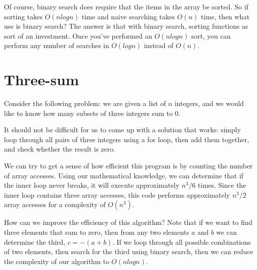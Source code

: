 \documentclass{article}
\begin{document}
Of course, binary search does require that the items in the array be sorted. So if sorting takes $O(n log n)$ time and naive searching takes $O(n)$ time, then what use is binary search? The answer is that with binary search, sorting functions as sort of an investment. Once you've performed an $O(n log n)$ sort, you can perform any number of searches in $O(log n)$ instead of $O(n)$.



\section{Three-sum}

Consider the following problem: we are given a list of $n$ integers, and we would like to know how many subsets of three integers sum to 0.

It should not be difficult for us to come up with a solution that works: simply loop through all pairs of three integers using a for loop, then add them together, and check whether the result is zero.


We can try to get a sense of how efficient this program is by counting the number of array accesses. Using our mathematical knowledge, we can determine that if the inner loop never breaks, it will execute approximately $n^3/6$ times. Since the inner loop contains three array accesses, this code performs approximately $n^3/2$ array accesses for a complexity of $O(n^3)$.

How can we improve the efficiency of this algorithm? Note that if we want to find three elements that sum to zero, then from any two elements $a$ and $b$ we can determine the third, $c = -(a + b)$. If we loop through all possible combinations of two elements, then search for the third using binary search, then we can reduce the complexity of our algorithm to $O(n log n)$.
\end{document}
